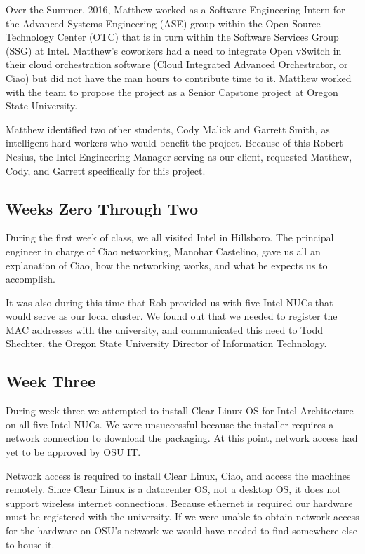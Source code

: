\documentclass[10pt,onecolumn,journal,draftclsnofoot]{IEEEtran}
\begin{document}
Over the Summer, 2016, Matthew worked as a Software Engineering Intern for the
Advanced Systems Engineering (ASE) group within the Open Source Technology
Center (OTC) that is in turn within the Software Services Group (SSG) at Intel.
Matthew's coworkers had a need to integrate Open vSwitch in their cloud
orchestration software (Cloud Integrated Advanced Orchestrator, or Ciao) but did
not have the man hours to contribute time to it. Matthew worked with the team to
propose the project as a Senior Capstone project at Oregon State University.

Matthew identified two other students, Cody Malick and Garrett Smith, as
intelligent hard workers who would benefit the project. Because of this Robert
Nesius, the Intel Engineering Manager serving as our client, requested Matthew,
Cody, and Garrett specifically for this project.

\subsection{Weeks Zero Through Two}

During the first week of class, we all visited Intel in Hillsboro. The principal
engineer in charge of Ciao networking, Manohar Castelino, gave us all an
explanation of Ciao, how the networking works, and what he expects us to
accomplish.

It was also during this time that Rob provided us with five Intel NUCs that
would serve as our local cluster. We found out that we needed to register the
MAC addresses with the university, and communicated this need to Todd Shechter,
the Oregon State University Director of Information Technology.

\subsection{Week Three}

During week three we attempted to install Clear Linux OS for Intel
Architecture~\cite{clearlinux} on all five Intel NUCs. We were unsuccessful
because the installer requires a network connection to download the packaging.
At this point, network access had yet to be approved by OSU IT.

Network access is required to install Clear Linux, Ciao, and access the machines
remotely. Since Clear Linux is a datacenter OS, not a desktop OS, it does not
support wireless internet connections. Because ethernet is required our hardware
must be registered with the university. If we were unable to obtain network
access for the hardware on OSU's network we would have needed to find somewhere
else to house it.
\end{document}
